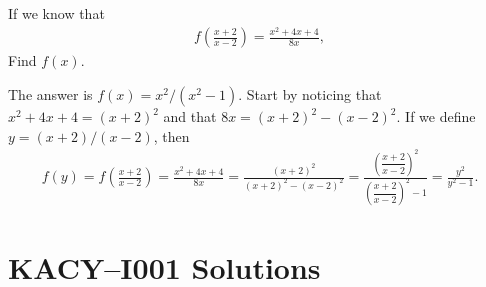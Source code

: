 \documentclass[12pt,a4paper]{memoir}
\theoremstyle{definition}
\begin{document}
	
\setcounter{question}{112}

	\begin{tcolorbox}
		\begin{question}
			If we know that
			\begin{align*}
				f\left(\frac{x+2}{x-2}\right) = \frac{x^2+4x+4}{8x},
			\end{align*}
			Find $f(x)$.
		\end{question}
	\end{tcolorbox}
	
	\begin{solution}
		The answer is $f(x) = {x^2}/{(x^2-1)}$. Start by noticing that $x^2+4x+4=(x+2)^2$ and that $8x = (x+2)^2 - (x-2)^2$. If we define $y=(x+2)/(x-2)$, then
		\begin{align*}
			f(y)=f\left(\frac{x+2}{x-2}\right) = \frac{x^2+4x+4}{8x} = \frac{(x+2)^2}{(x+2)^2 - (x-2)^2} = \frac{\left(\dfrac{x+2}{x-2}\right)^2}{\left(\dfrac{x+2}{x-2}\right)^2 - 1}= \frac{y^2}{y^2-1}.
		\end{align*}
	\end{solution}
	
	\newpage 
	\section*{KACY--I001 Solutions}
	
	\printsolutions
	
\end{document}
